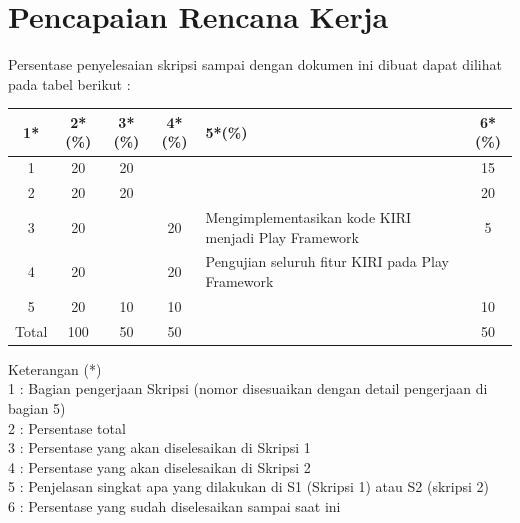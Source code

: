 \documentclass[a4paper,twoside]{article}
\begin{document}



\section{Pencapaian Rencana Kerja}
Persentase penyelesaian skripsi sampai dengan dokumen ini dibuat dapat dilihat pada tabel berikut :

\begin{center}
  \begin{tabular}{ | c | c | c | c | l | c |}
    \hline
    1*  & 2*(\%) & 3*(\%) & 4*(\%) &5*(\%) & 6*(\%) \\ \hline \hline
    1   & 20  & 20  &  & & 15 \\ \hline
    2   & 20 & 20  &   & & 20\\ \hline
    3   & 20  &   & 20 & {\footnotesize Mengimplementasikan kode KIRI menjadi Play Framework} & 5 \\ \hline
    4   & 20  &   &  20 & {\footnotesize Pengujian seluruh fitur KIRI pada Play Framework} & \\ \hline
    5   & 20  & 10  & 10 & &10 \\ \hline
    Total  & 100  & 50  & 50 & & 50 \\ \hline
                          \end{tabular}
\end{center}

Keterangan (*)\\
1 : Bagian pengerjaan Skripsi (nomor disesuaikan dengan detail pengerjaan di bagian 5)\\
2 : Persentase total \\
3 : Persentase yang akan diselesaikan di Skripsi 1 \\
4 : Persentase yang akan diselesaikan di Skripsi 2 \\
5 : Penjelasan singkat apa yang dilakukan di S1 (Skripsi 1) atau S2 (skripsi 2)\\
6 : Persentase yang sudah diselesaikan sampai saat ini 

\end{document}
